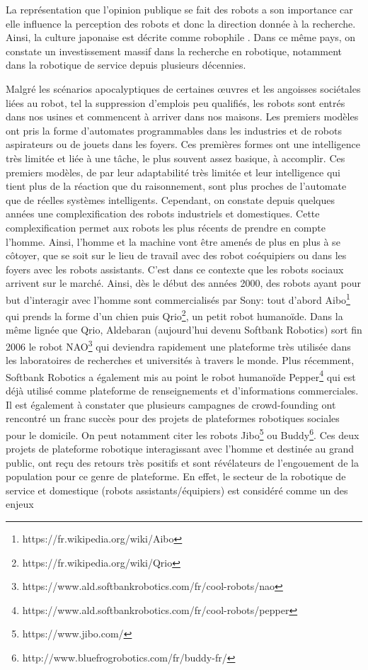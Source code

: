 \documentclass[a4paper,11pt,twoside]{StyleThese}
\begin{document}
La représentation que l'opinion publique se fait des robots a son importance car elle influence la perception des robots \cite{Sundar2016} et donc la direction donnée à la recherche. Ainsi, la culture japonaise est décrite comme robophile \cite{gilson98}. Dans ce même pays, on constate un investissement massif dans la recherche en robotique, notamment dans la robotique de service depuis plusieurs décennies.

Malgré les scénarios apocalyptiques de certaines œuvres et les angoisses sociétales liées au robot, tel la suppression d’emplois peu qualifiés, les robots sont entrés dans nos usines et commencent à arriver dans nos maisons. Les premiers modèles ont pris la forme d'automates programmables dans les industries et de robots aspirateurs ou de jouets dans les foyers. Ces premières formes ont une intelligence très limitée et liée à une tâche, le plus souvent assez basique, à accomplir. Ces premiers modèles, de par leur adaptabilité très limitée et leur intelligence qui tient plus de la réaction que du raisonnement, sont plus proches de l'automate que  de réelles systèmes intelligents. Cependant, on constate depuis quelques années une complexification des robots industriels et domestiques. Cette complexification permet aux robots les plus récents de prendre en compte l'homme. Ainsi, l'homme et la machine vont être amenés de plus en plus à se côtoyer, que se soit sur le lieu de travail avec des robot coéquipiers ou dans les foyers avec les robots assistants. C'est dans ce contexte que les robots sociaux arrivent sur le marché.
Ainsi, dès le début des années 2000, des robots ayant pour but d'interagir avec l'homme sont commercialisés par Sony: tout d'abord Aibo\footnote{https://fr.wikipedia.org/wiki/Aibo} qui prends la forme d'un chien puis Qrio\footnote{https://fr.wikipedia.org/wiki/Qrio}, un petit robot humanoïde. Dans la même lignée que Qrio, Aldebaran (aujourd'hui devenu Softbank Robotics) sort fin 2006 le robot NAO\footnote{https://www.ald.softbankrobotics.com/fr/cool-robots/nao} qui deviendra rapidement une plateforme très utilisée dans les laboratoires de recherches et universités à travers le monde.
Plus récemment, Softbank Robotics a également mis au point le robot humanoïde Pepper\footnote{https://www.ald.softbankrobotics.com/fr/cool-robots/pepper} qui est déjà utilisé comme plateforme de renseignements et d'informations commerciales. 
Il est également à constater que plusieurs campagnes de crowd-founding ont rencontré un franc succès pour des projets de plateformes robotiques sociales pour le domicile. On peut notamment citer les robots Jibo\footnote{https://www.jibo.com/} ou Buddy\footnote{http://www.bluefrogrobotics.com/fr/buddy-fr/}. Ces deux projets de plateforme robotique interagissant avec l'homme et destinée au grand public, ont reçu des retours très positifs et sont révélateurs de l'engouement de la population pour ce genre de plateforme. En effet, le secteur de la robotique de service et domestique (robots assistants/équipiers) est considéré comme un des enjeux
\end{document}
